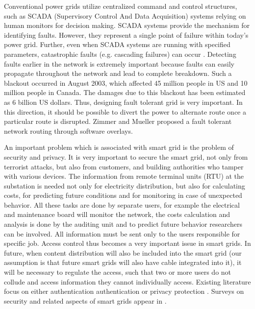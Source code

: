 \documentclass[conference]{IEEEtran}[10pt]
\begin{document}
Conventional power grids utilize centralized command and control structures, such as SCADA (Supervisory Control And Data Acquisition) systems relying on human monitors for decision making. 
SCADA systems provide the mechanism for identifying faults. However, they represent a single point of failure within today’s power grid. 
Further, even when SCADA systems are running with specified parameters, catastrophic faults (e.g. cascading failures) can occur \cite{ZM10}.
Detecting faults earlier in the network is extremely important because faults can easily propagate throughout the network and
lead to complete breakdown. Such a blackout occurred in August 2003, which affected 45 million people in US and 10 million people in Canada. 
The damages due to this blackout has been estimated as 6 billion US dollars. 
Thus, designing fault tolerant grid is very important. 
In this direction, it should be possible to divert the power to alternate route once a particular route is disrupted. 
Zimmer and Mueller \cite{ZM10} proposed a fault tolerant network routing through software overlays. 

An important problem which is associated with smart grid is the problem of security and privacy. 
It is very important to secure the smart grid, not only from terrorist attacks,
but also from customers, and building authorities who tamper with various devices.  
The information from remote terminal units (RTU) at the substation  is needed not only for electricity distribution, 
but also for calculating costs, for predicting future 
conditions and for monitoring in case of unexpected behavior. 
All these tasks are done by separate users, for example the electrical and maintenance board will monitor the network, 
the costs calculation and analysis is done by the auditing unit and to predict future behavior researchers can be involved. 
All information must be sent only to the users responsible for specific job. 
Access control thus becomes a very important issue in smart grids. 
In future, when content distribution will also be included into the smart grid (our assumption is that future smart grids will also have cable 
integrated into it),
it will be necessary to regulate the access, such that two or more users do not collude and access information they cannot individually access. 
Existing literature focus on either authentication authentication \cite{FFKLS10,CSSL11,KBYAH10} or
privacy protection \cite{RSMP11,SKTP11}. 
Surveys on security and related aspects of smart grids appear in \cite{MR10}.  
\end{document}
